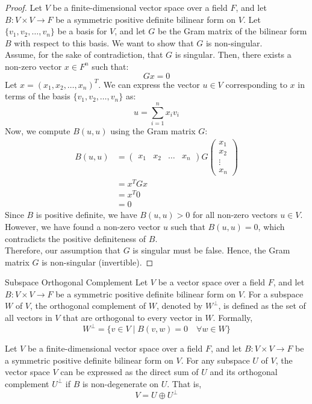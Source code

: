 \documentclass[openany]{book}
\begin{document}
\begin{proof}
Let $V$ be a finite-dimensional vector space over a field $F$, and let $B: V \times V \to F$ be a symmetric positive definite bilinear form on $V$. Let $\{v_1, v_2, \ldots, v_n\}$ be a basis for $V$, and let $G$ be the Gram matrix of the bilinear form $B$ with respect to this basis. We want to show that $G$ is non-singular. \\
Assume, for the sake of contradiction, that $G$ is singular. Then, there exists a non-zero vector $x \in F^n$ such that:
$$Gx = 0$$
Let $x = (x_1, x_2, \ldots, x_n)^T$. We can express the vector $u \in V$ corresponding to $x$ in terms of the basis $\{v_1, v_2, \ldots, v_n\}$ as:
$$u = \sum_{i=1}^n x_i v_i$$
Now, we compute $B(u, u)$ using the Gram matrix $G$:
\[\begin{aligned}
B(u, u) &= \begin{pmatrix} x_1 & x_2 & \ldots & x_n \end{pmatrix} G \begin{pmatrix} x_1 \\ x_2 \\ \vdots \\ x_n \end{pmatrix} \\
&= x^T G x \\
&= x^T 0 \\
&= 0
\end{aligned}\]
Since $B$ is positive definite, we have $B(u, u) > 0$ for all non-zero vectors $u \in V$. However, we have found a non-zero vector $u$ such that $B(u, u) = 0$, which contradicts the positive definiteness of $B$. \\
Therefore, our assumption that $G$ is singular must be false. Hence, the Gram matrix $G$ is non-singular (invertible).
\end{proof}
\begin{mydefinition}{Subspace Orthogonal Complement}
Let $V$ be a vector space over a field $F$, and let $B: V \times V \to F$ be a symmetric positive definite bilinear form on $V$. For a subspace $W$ of $V$, the orthogonal complement of $W$, denoted by $W^\perp$, is defined as the set of all vectors in $V$ that are orthogonal to every vector in $W$. Formally,
$$W^\perp = \{v \in V \mid B(v, w) = 0 \quad \forall w \in W\}$$
\end{mydefinition}
\begin{mytheorem}[$U \oplus U^\perp = V$]
Let $V$ be a finite-dimensional vector space over a field $F$, and let $B: V \times V \to F$ be a symmetric positive definite bilinear form on $V$. For any subspace $U$ of $V$, the vector space $V$ can be expressed as the direct sum of $U$ and its orthogonal complement $U^\perp$ if $B$ is non-degenerate on $U$. That is,
$$V = U \oplus U^\perp$$
\end{mytheorem}
\end{document}
